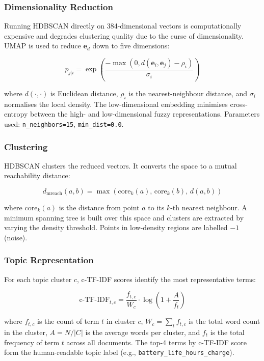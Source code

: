 \subsubsection{Dimensionality Reduction}
\begin{justify}
Running HDBSCAN directly on 384-dimensional vectors is computationally expensive and degrades clustering quality due to the curse of dimensionality. UMAP \cite{mcinnes2018umap} is used to reduce $\mathbf{e}_d$ down to five dimensions:

\begin{equation}
    p_{j|i} = \exp\!\left(\frac{-\max(0, d(\mathbf{e}_i, \mathbf{e}_j) - \rho_i)}{\sigma_i}\right)
\end{equation}

where $d(\cdot, \cdot)$ is Euclidean distance, $\rho_i$ is the nearest-neighbour distance, and $\sigma_i$ normalises the local density. The low-dimensional embedding minimises cross-entropy between the high- and low-dimensional fuzzy representations. Parameters used: \texttt{n\_neighbors=15}, \texttt{min\_dist=0.0}.
\end{justify}

\subsubsection{Clustering}
\begin{justify}
HDBSCAN \cite{campello2013density} clusters the reduced vectors. It converts the space to a mutual reachability distance:

\begin{equation}
    d_{\text{mreach}}(a, b) = \max\!\left(\text{core}_k(a),\, \text{core}_k(b),\, d(a, b)\right)
\end{equation}

where $\text{core}_k(a)$ is the distance from point $a$ to its $k$-th nearest neighbour. A minimum spanning tree is built over this space and clusters are extracted by varying the density threshold. Points in low-density regions are labelled $-1$ (noise).
\end{justify}

\subsubsection{Topic Representation}
\begin{justify}
For each topic cluster $c$, c-TF-IDF scores identify the most representative terms:

\begin{equation}
    \text{c-TF-IDF}_{t,c} = \frac{f_{t,c}}{W_c} \cdot \log\!\left(1 + \frac{A}{f_t}\right)
\end{equation}

where $f_{t,c}$ is the count of term $t$ in cluster $c$, $W_c = \sum_t f_{t,c}$ is the total word count in the cluster, $A = N / |C|$ is the average words per cluster, and $f_t$ is the total frequency of term $t$ across all documents. The top-4 terms by c-TF-IDF score form the human-readable topic label (e.g., \texttt{battery\_life\_hours\_charge}).
\end{justify}

